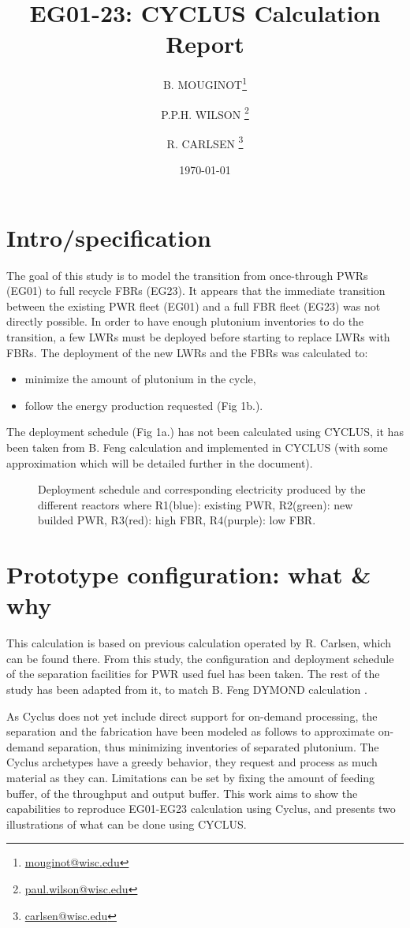 \documentclass[12pt]{article}
\title{EG01-23: CYCLUS Calculation Report}
\author[1]{B. MOUGINOT\thanks{\href{mailto:mouginot@wisc.edu}{mouginot@wisc.edu}}}
\author[1]{P.P.H. WILSON \thanks{\href{mailto:paul.wilson@wisc.edu}{paul.wilson@wisc.edu}}}
\author[1]{R. CARLSEN \thanks{\href{mailto:carlsen@wisc.edu}{carlsen@wisc.edu}}}
\affil[1]{University of Wisconsin-Madison, Department of Engineering Physics, CNERG group}
\date{\today}
\begin{document}
\maketitle

\section{Intro/specification}
The goal of this study is to model the transition
from once-through PWRs (EG01) to full recycle FBRs
(EG23). It appears that the immediate transition
between the existing PWR fleet (EG01) and a full
FBR fleet (EG23) was not directly possible. In
order to have enough plutonium inventories to do
the transition, a few LWRs must be deployed before
starting to replace LWRs with FBRs. The deployment
of the new LWRs and the FBRs was calculated to:
\begin{itemize}
\item minimize the amount of plutonium in the cycle,
\item follow the energy production requested (Fig 1b.).
\end{itemize}
The deployment schedule (Fig 1a.) has not been
calculated using CYCLUS, it has been taken from B.
Feng calculation and implemented in CYCLUS (with
some approximation which will be detailed further
in the document).

\begin{figure}[h!]
\centering
{}
\caption{Deployment schedule and corresponding
electricity produced by the different reactors
where R1(blue): existing PWR, R2(green): new
builded PWR, R3(red): high FBR, R4(purple): low
FBR.\label{fig:deployment} }
\end{figure}


\pagebreak
\section{Prototype configuration: what \& why}
This calculation is based on previous calculation
operated by R. Carlsen, which can be found there.
From this study, the configuration and deployment
schedule of the separation facilities for PWR used
fuel has been taken. The rest of the study has
been adapted from it, to match B. Feng DYMOND
calculation \cite{B.Feng_calculation}.

As Cyclus does not yet include direct support for
on-demand processing, the separation and the
fabrication have been modeled as follows to
approximate on-demand separation, thus minimizing
inventories of separated plutonium.
The Cyclus archetypes have a greedy behavior, they
request and process as much material as they can.
Limitations can be set by fixing the amount of
feeding buffer, of the throughput and output
buffer.
This work aims to show the capabilities to
reproduce EG01-EG23 calculation using Cyclus, and
presents two illustrations of what can be done
using CYCLUS.
\end{document}
